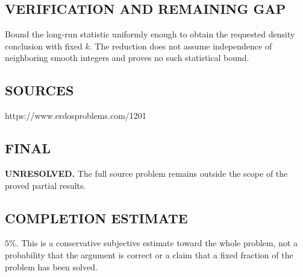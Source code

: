 \subsection*{VERIFICATION AND REMAINING GAP}
Bound the long-run statistic uniformly enough to obtain the requested
density conclusion with fixed $k$. The reduction does not assume independence
of neighboring smooth integers and proves no such statistical bound.

\subsection*{SOURCES}
https://www.erdosproblems.com/1201

\subsection*{FINAL}
\textbf{UNRESOLVED.} The full source problem remains outside the scope of the proved partial results.

\subsection*{COMPLETION ESTIMATE}
$5\%$. This is a conservative subjective estimate toward the whole problem, not a probability that the argument is correct or a claim that a fixed fraction of the problem has been solved.
